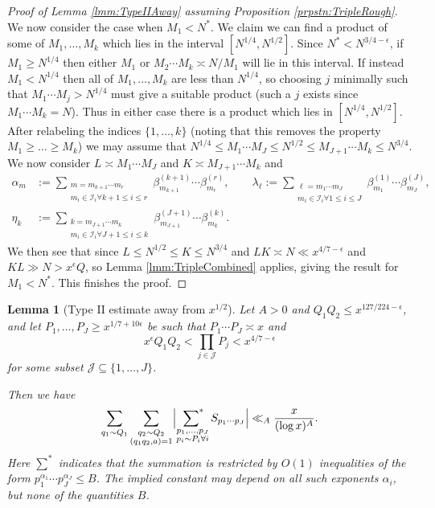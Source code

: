 \documentclass[10pt]{amsart}
\theoremstyle{plain}
\newtheorem{lmm}[thrm]{Lemma}
\numberwithin{equation}{section}
\begin{document}
\begin{proof}[Proof of Lemma \ref{lmm:TypeIIAway} assuming Proposition \ref{prpstn:TripleRough}]
We now consider the case when $M_1<N^*$. We claim we can find a product of some of $M_1,\dots,M_k$ which lies in the interval $[N^{1/4},N^{1/2}]$. Since $N^*<N^{3/4-\epsilon}$, if $M_1\ge N^{1/4}$ then either $M_1$ or $M_2\cdots M_k\asymp N/M_1$ will lie in this interval.
If instead $M_1<N^{1/4}$ then all of $M_1,\dots ,M_k$ are less than $N^{1/4}$, so choosing $j$ minimally such that $M_1\cdots M_j>N^{1/4}$ must give a suitable product (such a $j$ exists since $M_1\cdots M_k= N$). Thus in either case there is a product which lies in $[N^{1/4},N^{1/2}]$. After relabeling the indices $\{1,\dots,k\}$ (noting that this removes the property $M_1\ge \dots\ge M_k$) we may assume that $N^{1/4}\le M_1\cdots M_J\le N^{1/2}\le M_{J+1}\cdots M_k\le N^{3/4}$. We now consider $L\asymp M_1\cdots M_J$ and $K\asymp M_{J+1}\cdots M_k$ and
\begin{align*}
\alpha_m&:=\sum_{\substack{m=m_{k+1}\cdots m_r\\ m_i\in \mathcal{I}_i\forall k+1\le i\le r}}\beta^{(k+1)}_{m_{k+1}}\cdots \beta^{(r)}_{m_r},\qquad \lambda_\ell:=\sum_{\substack{\ell=m_1\cdots m_J\\ m_i\in\mathcal{I}_i\forall 1\le i \le J}}\beta^{(1)}_{m_1}\cdots \beta^{(J)}_{m_J},\\
\eta_k&:=\sum_{\substack{k=m_{J+1}\cdots m_k\\ m_i\in\mathcal{I}_i\forall J+1\le i \le k}}\beta^{(J+1)}_{m_{J+1}}\cdots \beta^{(k)}_{m_k}.
\end{align*}
We then see that since $L\le N^{1/2}\le K\le N^{3/4}$ and $L K\asymp N\ll x^{4/7-\epsilon}$ and $KL\gg N>x^{\epsilon} Q$, so Lemma \ref{lmm:TripleCombined} applies, giving the result for $M_1<N^*$. This finishes the proof.
\end{proof}
%
%
%
%
%
%
%
%
\begin{lmm}[Type II estimate away from $x^{1/2}$]\label{lmm:BasicTypeII}
Let $A>0$ and $Q_1Q_2\le x^{127/224-\epsilon}$, and let $P_1,\dots, P_J\ge x^{1/7+10\epsilon}$ be such that $P_1\cdots P_J\asymp x$ and
\[
x^{\epsilon}Q_1Q_2 <\prod_{j\in\mathcal{J}}P_j<x^{4/7-\epsilon}
\]
for some subset $\mathcal{J}\subseteq\{1,\dots,J\}$. 

Then we have
\[
\sum_{q_1\sim Q_1}\sum_{\substack{q_2\sim Q_2\\ (q_1q_2,a)=1}}\Bigl|\mathop{\sideset{}{^*}\sum}_{\substack{p_1,\dots,p_J\\ p_i\sim P_i\forall i}}S_{p_1\cdots p_J}\Bigr|\ll_{A}\frac{x}{(\log{x})^A}.
\]
Here $\sum^*$ indicates that the summation is restricted by $O(1)$ inequalities of the form $p_1^{\alpha_1}\cdots p_J^{\alpha_J}\le B$. The implied constant may depend on all such exponents $\alpha_i$, but none of the quantities $B$.
\end{lmm}
\end{document}
